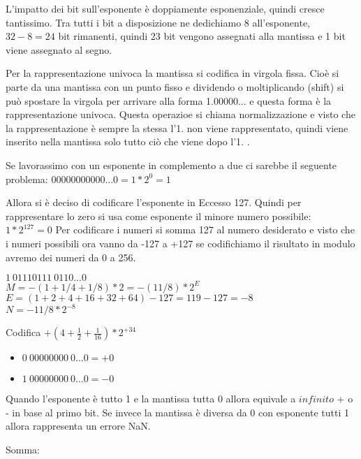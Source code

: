 \documentclass[a4paper]{article}
\theoremstyle{break}
\theoremstyle{break}
\theoremstyle{break}
\theoremstyle{break}
\begin{document}
L'impatto dei bit sull'esponente è doppiamente esponenziale, quindi cresce tantissimo.
Tra tutti i bit a disposizione ne dedichiamo 8 all'esponente, $32 - 8 = 24$ bit rimanenti,
quindi 23 bit vengono assegnati alla mantissa e 1 bit viene assegnato al segno.
\label{fig:disegno1}

Per la rappresentazione univoca la mantissa si codifica in virgola fissa.
Cioè si parte da una mantissa con un punto fisso e dividendo o moltiplicando (shift) si
può spostare la virgola per arrivare alla forma 1.00000... e questa forma è la
rappresentazione univoca. Questa operazioe si chiama normalizzazione e visto che la
rappresentazione è sempre la stessa l'1. non viene rappresentato, quindi
viene inserito nella mantissa solo tutto ciò che viene dopo l'1. .
\label{fig:disegno2}

Se lavorassimo con un esponente in complemento a due ci sarebbe il seguente problema:
$00000000000...0 = 1*2^{0}=1$

Allora si è deciso di codificare l'esponente in Eccesso 127. Quindi per rappresentare
lo zero si usa come esponente il minore numero possibile: $1*2^{127} = 0$
Per codificare i numeri si somma 127 al numero desiderato e visto che i numeri possibili
ora vanno da -127 a +127 se codifichiamo il risultato in modulo avremo dei numeri
da 0 a 256.

\begin{example}
	$1\:01110111\:0110...0$\\
	$M = -(1+1/4+1/8)*2 = -(11/8)*2^{E}$\\
	$E = (1+2+4+16+32+64)-127=119-127=-8$\\
	$N = -11/8 * 2^{-8}$
\end{example}
\begin{exercise}
	Codifica $+(4+\frac{1}{2}+\frac{1}{16})*2^{+34}$
\end{exercise}

\begin{itemize}
	\item $0\:00000000\:0...0 = +0$
	\item $1\:00000000\:0...0 = -0$
\end{itemize}

Quando l'esponente è tutto 1 e la mantissa tutta 0 allora equivale a $infinito$
+ o - in base al primo bit. Se invece la mantissa è diversa da 0 con esponente tutti 1
allora rappresenta un errore NaN.

Somma:\\
\label{es2}
\end{document}
